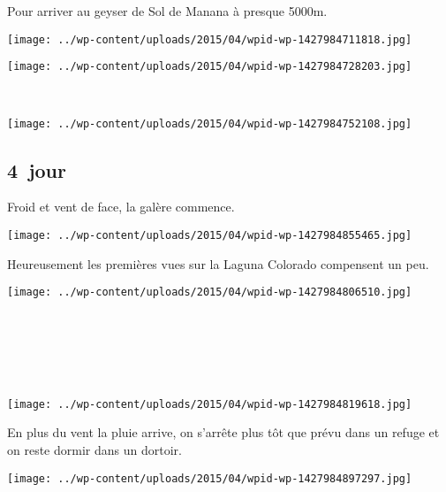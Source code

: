 \pagebreak
  Pour arriver au geyser de Sol de Manana à presque 5000m.
\begin{center} \texttt{[image: ../wp-content/uploads/2015/04/wpid-wp-1427984711818.jpg]} \end{center}
\begin{center} \texttt{[image: ../wp-content/uploads/2015/04/wpid-wp-1427984728203.jpg]} \end{center}
\vspace{-\topsep}
\pagebreak
~\\
\vspace{1mm}
\begin{center} \texttt{[image: ../wp-content/uploads/2015/04/wpid-wp-1427984752108.jpg]} \end{center}

 \subsection*{4\ieme\ jour} 

 Froid et vent de face, la galère commence.
\begin{center} \texttt{[image: ../wp-content/uploads/2015/04/wpid-wp-1427984855465.jpg]} \end{center}
\vspace{-\topsep}

\pagebreak
 Heureusement les premières vues sur la Laguna Colorado compensent un peu.
\begin{center} \texttt{[image: ../wp-content/uploads/2015/04/wpid-wp-1427984806510.jpg]} \end{center}
\subsection*{~}
~
\begin{center} \texttt{[image: ../wp-content/uploads/2015/04/wpid-wp-1427984819618.jpg]} \end{center}
\vspace{-\topsep}

\pagebreak
 En plus du vent la pluie arrive, on s'arrête plus tôt que prévu dans un refuge et on reste dormir dans un dortoir.
\begin{center} \texttt{[image: ../wp-content/uploads/2015/04/wpid-wp-1427984897297.jpg]} \end{center}

